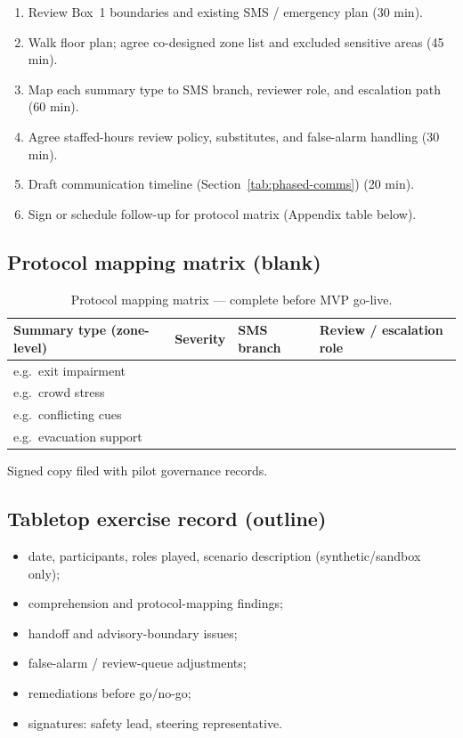 \begin{enumerate}[noitemsep]
  \item Review Box~1 boundaries and existing SMS / emergency plan (30 min).
  \item Walk floor plan; agree co-designed zone list and excluded sensitive areas (45 min).
  \item Map each summary type to SMS branch, reviewer role, and escalation path (60 min).
  \item Agree staffed-hours review policy, substitutes, and false-alarm handling (30 min).
  \item Draft communication timeline (Section~\ref{tab:phased-comms}) (20 min).
  \item Sign or schedule follow-up for protocol matrix (Appendix table below).
\end{enumerate}

\subsection{Protocol mapping matrix (blank)}

\begin{table}[htbp]
  \centering
  \caption{Protocol mapping matrix --- complete before MVP go-live.}
  \label{tab:protocol-matrix-template}
  \footnotesize
  \begin{tabular}{@{}p{3.2cm}p{2.4cm}p{2.4cm}p{4.0cm}@{}}
    \toprule
    Summary type (zone-level) & Severity & SMS branch & Review / escalation role \\
    \midrule
    e.g.\ exit impairment & & & \\
    e.g.\ crowd stress & & & \\
    e.g.\ conflicting cues & & & \\
    e.g.\ evacuation support & & & \\
    \bottomrule
  \end{tabular}
\end{table}

Signed copy filed with pilot governance records.

\subsection{Tabletop exercise record (outline)}

\begin{itemize}[noitemsep]
  \item date, participants, roles played, scenario description (synthetic/sandbox only);
  \item comprehension and protocol-mapping findings;
  \item handoff and advisory-boundary issues;
  \item false-alarm / review-queue adjustments;
  \item remediations before go/no-go;
  \item signatures: safety lead, steering representative.
\end{itemize}

